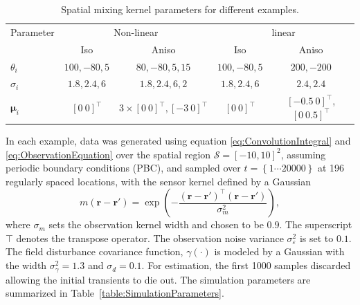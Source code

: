 \documentclass[10pt,twocolumn,twoside]{IEEEtran}
\begin{document}
\begin{table}[h]
\begin{center}
{\tiny\begin{tabular}{lcccc} 
\hline\hline
\multicolumn{1}{c}{Parameter} & \multicolumn{ 2}{c}{Non-linear} & \multicolumn{ 2}{c}{linear}   \\  \cline{ 1- 5}   
\multicolumn{ 1}{c}{} & Iso & Aniso & Iso & Aniso \vspace{1 mm}\\ 
$\theta_i$ & $100, -80, 5$ & $80, -80, 5, 15$ &$100, -80, 5$&$200, -200$  \\ 
$\sigma_i$ & $1.8, 2.4, 6$ &$1.8, 2.4, 6, 2$ & $1.8, 2.4, 6$ & $2.4, 2.4$ \\ 
$\boldsymbol{\mu}_i$&$[0~0]^{\top}$& $3\times[0~0]^{\top}, [-3~0]^{\top}$ &$[0~0]^{\top}$  &$[-0.5~0]^{\top}$, $[0~0.5]^{\top}$  \vspace{2 mm}\\ \hline \hline
\end{tabular}}
\end{center}
\caption{Spatial mixing kernel parameters for different examples.}
\label{table:KernelParameters}
\end{table}
 In each example, data was generated using equation \eqref{eq:ConvolutionIntegral} and \eqref{eq:ObservationEquation} over the spatial region $\mathcal{S}=[-10,10]^2 $, assuming periodic boundary conditions (PBC), and sampled over $t=\left\lbrace1 \cdots 20000  \right\rbrace $ at 196 regularly spaced locations, with the sensor kernel defined by a Gaussian
\begin{equation}\label{eq:observationkernel}
 	m\left(\mathbf{r}-\mathbf{r}'\right) = \exp{\left(-\frac{(\mathbf{r}-\mathbf{r}')^\top(\mathbf{r}-\mathbf{r}')}{\sigma_m^2}\right)},
 \end{equation} 
 where $\sigma_m$ sets the observation kernel width and chosen to be $0.9$.
The superscript $\top$ denotes the transpose operator.
The observation noise variance $\sigma_{\varepsilon}^2$ is set to $0.1$.
The field disturbance covariance function, $\gamma(\cdot)$ is modeled by a Gaussian with the width $\sigma_{\gamma}^2=1.3$ and $\sigma_d=0.1$.
For estimation, the first 1000 samples discarded allowing the initial transients to die out.
The simulation parameters are summarized in Table~\ref{table:SimulationParameters}.
\end{document}
